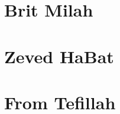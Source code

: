 \documentclass[letterpaper]{memoir}
\newcommand{\song}[2]{}
\begin{document}
\chapter{Brit Milah}
\song{Mah Tov Mah Na'im}{Mah_Tov_Mah_Na'im.pdf}
\song{Yehi Shalom b'Chelenu (Yerushalmi)}{Yehi_Shalom_b'Chelenu.pdf} %
\song{Yehi Shalom B'Cheleinu (Syrian)}{Yehi_Shalom_B'Cheleinu-Syrian.pdf}

\chapter{Zeved HaBat}
\song{Nava Yafa Tz'viyah}{Nava_Yafa_Tz'viyah.pdf}

\chapter{From Tefillah}
\song{Azharot}{Azharot.pdf}
\song{Halleluyah Tehillim 150}{Halleluyah_Tehillim_150.pdf}
\song{Pitchu Li}{Pitchu_Li.pdf}
\end{document}
